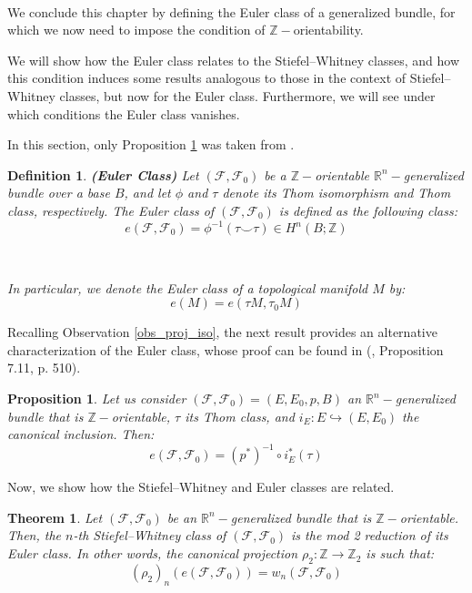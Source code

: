 \documentclass[12pt,oneside]{book}
\newtheorem{defi}   {Definition}[chapter]
\newtheorem{teo}    {Theorem}[chapter]
\newtheorem{prop}   {Proposition}[chapter]
\newcommand{\R}{\mathbb{R}}
\newcommand{\Z}{\mathbb{Z}}
\newcommand{\ccup}{\smile}
\begin{document}
    \

    We conclude this chapter by defining the Euler class of a generalized bundle, for which we now need to impose the condition of 
    $\Z-$orientability.

    We will show how the Euler class relates to the Stiefel–Whitney classes, and how this condition induces some 
    results analogous to those in the context of Stiefel–Whitney classes, but now for the Euler class. Furthermore, we will see under which 
    conditions the Euler class vanishes.

    In this section, only Proposition \ref{euler_2} was taken from \cite{fadell_1}.

    \begin{defi}{\bf (Euler Class)}
    	Let $(\mathcal{F},\mathcal{F}_{0})$ be a $\Z-$orientable $\R^{n}-$generalized bundle over a base 
        $B$, and let $\phi$ and $\tau$ denote its Thom isomorphism and Thom class, respectively. 
        The Euler class of $(\mathcal{F},\mathcal{F}_{0})$ is defined as the following class:
    	$$ e(\mathcal{F},\mathcal{F}_{0}) = \phi^{-1}(\tau \ccup \tau) \in H^{n}(B;\Z) $$

        \

    	In particular, we denote the Euler class of a topological manifold $M$ by:
    	$$ e(M) = e(\tau M, \tau_{0} M) $$
    \end{defi}

    Recalling Observation \ref{obs_proj_iso}, the next result provides an alternative characterization of the Euler class, whose proof can be 
    found in (\cite{fadell_1}, Proposition 7.11, p. 510).

    \begin{prop}\label{euler_2}
    	Let us consider $(\mathcal{F},\mathcal{F}_{0})=(E,E_{0},p,B)$ an $\R^{n}-$generalized bundle that is 
        $\Z-$orientable, $\tau$ its Thom class, and $i_{E}:E\hookrightarrow (E,E_{0})$ 
        the canonical inclusion. Then:
    	$$ e(\mathcal{F},\mathcal{F}_{0})=(p^{*})^{-1}\circ i_{E}^{*}(\tau) $$
    \end{prop}

    Now, we show how the Stiefel–Whitney and Euler classes are related.

    \begin{teo}\label{euler_sw}
    	Let $(\mathcal{F},\mathcal{F}_{0})$ be an $\R^{n}-$generalized bundle that is $\Z-$orientable. 
        Then, the $n$-th Stiefel–Whitney class of $(\mathcal{F},\mathcal{F}_{0})$ is the mod 2 
        reduction of its Euler class. In other words, the canonical projection $\rho_{2}:\Z\to\Z_{2}$ is such 
        that:
    	$$ (\rho_{2})_{n}(e(\mathcal{F},\mathcal{F}_{0}))=w_{n}(\mathcal{F},\mathcal{F}_{0}) $$
    \end{teo}
\end{document}
